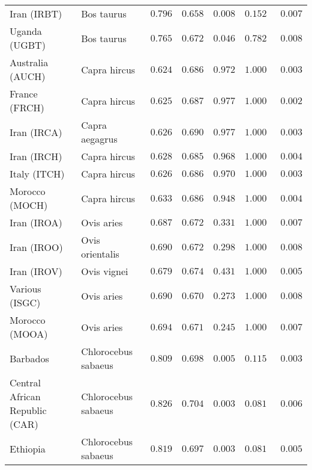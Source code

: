 \begin{center}
\begin{adjustbox}{width = 1\textwidth}
\begin{tabular}{|l|l|r|r|r|r|r|}
            Iran (IRBT)               & Bos taurus        & $ 0.796$ & $ 0.658$ & $ 0.008$ & $ 0.152~~$     & $ 0.007$ \\
            Uganda (UGBT)                  & Bos taurus        & $ 0.765$ & $ 0.672$ & $ 0.046$ & $ 0.782~~$     & $ 0.008$ \\
            Australia (AUCH)                    & Capra hircus      & $ 0.624$ & $ 0.686$ & $ 0.972$ & $ 1.000~~$     & $ 0.003$ \\
            France (FRCH)                    & Capra hircus        & $ 0.625$ & $ 0.687$ & $ 0.977$ & $ 1.000~~$     & $ 0.002$ \\
            Iran (IRCA)                   & Capra aegagrus        & $ 0.626$ & $ 0.690$ & $ 0.977$ & $ 1.000~~$     & $ 0.003$ \\
            Iran (IRCH)                 & Capra hircus        & $ 0.628$ & $ 0.685$ & $ 0.968$ & $ 1.000~~$     & $ 0.004$ \\
            Italy (ITCH)                    & Capra hircus          & $ 0.626$ & $ 0.686$ & $ 0.970$ & $ 1.000~~$     & $ 0.003$ \\
            Morocco (MOCH)                    & Capra hircus     & $ 0.633$ & $ 0.686$ & $ 0.948$ & $ 1.000~~$     & $ 0.004$ \\
            Iran (IROA)                    & Ovis aries         & $ 0.687$ & $ 0.672$ & $ 0.331$ & $ 1.000~~$     & $ 0.007$ \\
            Iran (IROO)                 & Ovis orientalis          & $ 0.690$ & $ 0.672$ & $ 0.298$ & $ 1.000~~$     & $ 0.008$ \\
            Iran (IROV)                 & Ovis vignei          & $ 0.679$ & $ 0.674$ & $ 0.431$ & $ 1.000~~$     & $ 0.005$ \\
            Various (ISGC)                       & Ovis aries & $ 0.690$ & $ 0.670$ & $ 0.273$ & $ 1.000~~$     & $ 0.008$ \\
            Morocco (MOOA) & Ovis aries & $ 0.694$ & $ 0.671$ & $ 0.245$ & $ 1.000~~$ & $ 0.007$ \\
            Barbados                       & Chlorocebus sabaeus & $ 0.809$ & $ 0.698$ & $ 0.005$ & $ 0.115~~$     & $ 0.003$ \\
            Central African Republic (CAR)                         & Chlorocebus sabaeus & $ 0.826$ & $ 0.704$ & $ 0.003$ & $ 0.081~~$     & $ 0.006$ \\
            Ethiopia                          & Chlorocebus sabaeus & $ 0.819$ & $ 0.697$ & $ 0.003$ & $ 0.081~~$     & $ 0.005$ \\

\end{tabular}
\end{adjustbox}
\end{center}
